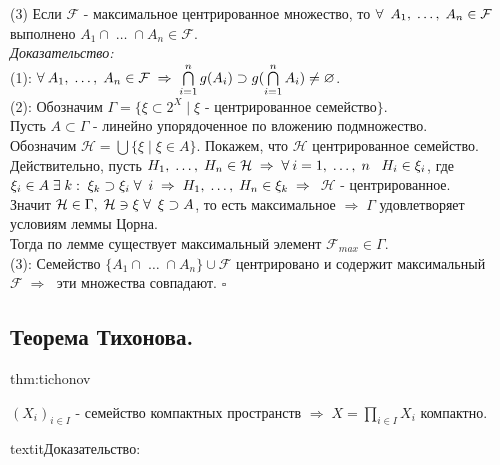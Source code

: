\documentclass[../../main.tex]{subfiles}
\begin{document}
(3) Если $\mathcal F$ - максимальное центрированное множество, то $\forall\:\; A_1,\;  \ldots ,\; A_n \in \mathcal F$ выполнено $A_1\cap\; \ldots \;\cap A_n \in \mathcal F$.\\
\textit{Доказательство:}\\
(1): $\forall\: A_1,\;  \ldots ,\; A_n \in \mathcal F\; \Rightarrow\; \bigcap\limits_{i=1}^n g(A_i)\supset g(\bigcap\limits_{i=1}^n A_i)\neq \varnothing$.\\
(2): Обозначим $\Gamma = \{\xi\subset2^X\; |\; \xi\text{ - центрированное семейство}\}$.\\
Пусть $A\subset\Gamma$ - линейно упорядоченное по вложению подмножество.\\
Обозначим $\mathcal H =\bigcup \{\xi\; | \; \xi\in A\}$. Покажем, что $\mathcal H$ центрированное семейство.\\
Действительно, пусть $ H_1,\;  \ldots ,\; H_n\in \mathcal H\;\Rightarrow\; \forall\: i = 1,\; \ldots ,\;n\;\;\; H_i \in \xi_i$, где $ \xi_i\in A\; \exists\; k:\; \xi_k \supset \xi_i\; \forall\:\; i \;\Rightarrow\; H_1,\; \ldots ,\;H_n\in \xi_k\;\Rightarrow\;$ $\mathcal H\text{ - центрированное}$.\\
Значит $\mathcal H\in\Gamma,\; \mathcal H \ni \xi\; \forall\:\; \xi \supset A$, то есть максимальное $\Rightarrow\; \Gamma$ удовлетворяет условиям леммы Цорна.\\
Тогда  по лемме существует максимальный элемент $\mathcal F_{max}\in\Gamma$.\\
(3): Семейство $\{A_1\cap\; \ldots \;\cap A_n\}\cup\mathcal F$ центрировано и содержит максимальный $\mathcal F\; \Rightarrow\;$ эти множества совпадают. $\square$

\subsection{Теорема Тихонова.}

\begin{theo}[(Тихонова)]{thm:tichonov}

$(X_i)_{i\in I}$ - семейство компактных пространств $\Rightarrow\; X=\prod\limits_{i\in I} X_i$ компактно.

\end{theo}
textit{Доказательство:}
\end{document}
